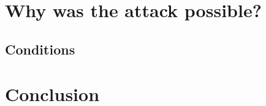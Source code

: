 \documentclass[12pt]{article}
\begin{document}
\section{Why was the attack possible?}
\subsection{Conditions}


\section{Conclusion}

\pagebreak




\end{document}
